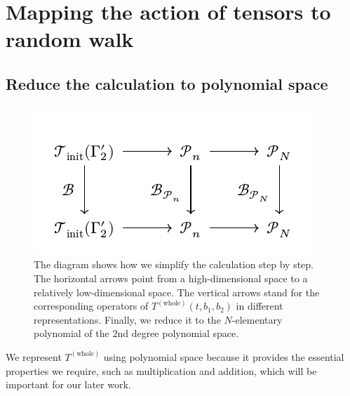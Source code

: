 \documentclass{article}
\newcommand{\Twhole}{T^{(\text{whole})}}
\begin{document}
\section{Mapping the action of tensors to random walk}
\label{sec: Mapping the action of tensors to random walk}
\subsection{Reduce the calculation to polynomial space}
\begin{figure}
    \centering
    \includegraphics[width=0.8\linewidth]{figures/appendix/commute_diagram.pdf}
    \caption{The diagram shows how we simplify the calculation step by step. The horizontal arrows point from a high-dimensional space to a relatively low-dimensional space. The vertical arrows stand for the corresponding operators of $\Twhole(t,b_1, b_2)$ in different representations. Finally, we reduce it to the $N$-elementary polynomial of the $2$nd degree polynomial space.}
    \label{diagram: commute diagram}
\end{figure}

We represent $\Twhole$ using polynomial space because it provides the essential properties we require, such as multiplication and addition, which will be important for our later work. 
\end{document}
